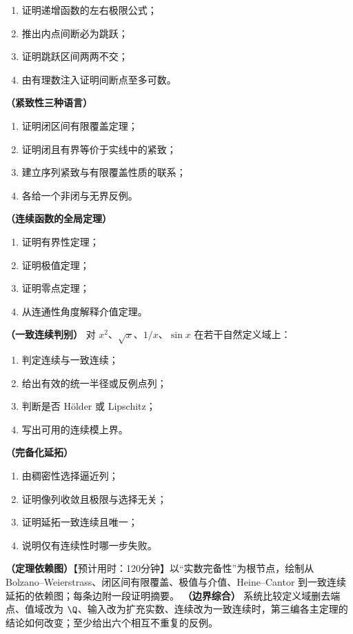 \begin{enumerate}[label=\textbf{III.\arabic*.}]
 \begin{enumerate}
  \item 证明递增函数的左右极限公式；
  \item 推出内点间断必为跳跃；
  \item 证明跳跃区间两两不交；
  \item 由有理数注入证明间断点至多可数。
 \end{enumerate}
  \mustdo\textbf{（紧致性三种语言）}
 \begin{enumerate}
  \item 证明闭区间有限覆盖定理；
  \item 证明闭且有界等价于实线中的紧致；
  \item 建立序列紧致与有限覆盖性质的联系；
  \item 各给一个非闭与无界反例。
 \end{enumerate}
  \mustdo\textbf{（连续函数的全局定理）}
 \begin{enumerate}
  \item 证明有界性定理；
  \item 证明极值定理；
  \item 证明零点定理；
  \item 从连通性角度解释介值定理。
 \end{enumerate}
  \mustdo\textbf{（一致连续判别）} 对 \(x^2\)、\(\sqrt x\)、\(1/x\)、\(\sin x\) 在若干自然定义域上：
 \begin{enumerate}
  \item 判定连续与一致连续；
  \item 给出有效的统一半径或反例点列；
  \item 判断是否 Hölder 或 Lipschitz；
  \item 写出可用的连续模上界。
 \end{enumerate}
  \mustdo\textbf{（完备化延拓）}
 \begin{enumerate}
  \item 由稠密性选择逼近列；
  \item 证明像列收敛且极限与选择无关；
  \item 证明延拓一致连续且唯一；
  \item 说明仅有连续性时哪一步失败。
 \end{enumerate}
  \projectdo\textbf{（定理依赖图）}【预计用时：120分钟】以“实数完备性”为根节点，绘制从 Bolzano--Weierstrass、闭区间有限覆盖、极值与介值、Heine--Cantor 到一致连续延拓的依赖图；每条边附一段证明摘要。
  \opendo\textbf{（边界综合）} 系统比较定义域删去端点、值域改为 \(\Q\)、输入改为扩充实数、连续改为一致连续时，第三编各主定理的结论如何改变；至少给出六个相互不重复的反例。
\end{enumerate}
